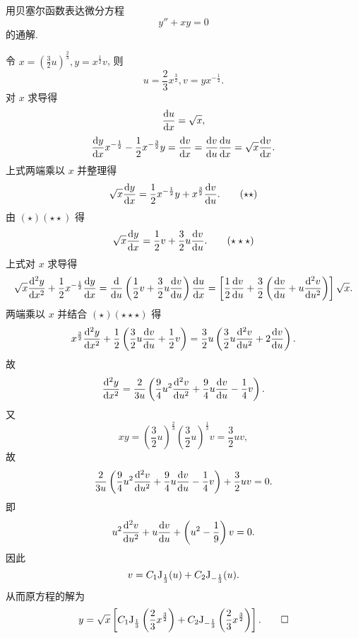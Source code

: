 \begin{exercise}
  用贝塞尔函数表达微分方程
  \[y''+xy=0\]
  的通解.
\end{exercise}

\begin{solution} 
  令 $x=\left(\frac{3}{2}u\right)^{\frac{2}{3}},y=x^{\frac{1}{2}}v$, 则
  \begin{equation}
    u=\frac{2}{3}x^{\frac{3}{2}},v=yx^{-\frac{1}{2}}. \tag{$\star$}
  \end{equation}
  对 $x$ 求导得
  \[\frac{\mathop{}\!\mathrm{d} u}{\mathop{}\!\mathrm{d} x}=\sqrt{x},\]
  \[\frac{\diff y}{\diff x}x^{-\frac{1}{2}}-\frac{1}{2}x^{-\frac{3}{2}}y
    = \frac{\diff v}{\diff x}=\frac{\diff v}{\diff u}\frac{\diff u}{\diff x}
    = \sqrt{x}\frac{\diff v}{\diff x}.\]
  上式两端乘以 $x$ 并整理得
  \begin{equation}
    \sqrt{x}\frac{\mathop{}\!\mathrm{d} y}{\mathop{}\!\mathrm{d} x}
      = \frac{1}{2}x^{-\frac{1}{2}}y+x^{\frac{3}{2}}\frac{\mathop{}\!\mathrm{d} v}{\mathop{}\!\mathrm{d} u}.
    \tag{$\star\star$}
  \end{equation}
  由 $(\star)(\star\star)$ 得
  \begin{equation}
    \sqrt{x}\frac{\mathop{}\!\mathrm{d} y}{\mathop{}\!\mathrm{d} x}=\frac{1}{2}v+\frac{3}{2}u\frac{\mathop{}\!\mathrm{d} v}{\mathop{}\!\mathrm{d} u}.
    \tag{$\star\star\star$}
  \end{equation}
  上式对 $x$ 求导得
  \[\sqrt{x}\frac{\diff^2y}{\diff x^2}+\frac{1}{2}x^{-\frac{1}{2}}\frac{\diff y}{\diff x}
    = \frac{\diff}{\diff u}\left(\frac{1}{2}v+\frac{3}{2}u\frac{\diff v}{\diff u}\right)\frac{\diff u}{\diff x}
    = \left[\frac{1}{2}\frac{\diff v}{\diff u}+\frac{3}{2}\left(\frac{\diff v}{\diff u}+u\frac{\diff^2v}{\diff u^2}\right)\right]\sqrt{x}.\]
  两端乘以 $x$ 并结合 $(\star)(\star\star\star)$ 得
  \[x^{\frac{3}{2}}\frac{\diff^2y}{\diff x^2}
    + \frac{1}{2}\left(\frac{3}{2}u\frac{\diff v}{\diff u}
    + \frac{1}{2}v\right)
    = \frac{3}{2}u\left(\frac{3}{2}u\frac{\diff^2v}{\diff u^2}+2\frac{\diff v}{\diff u}\right).\]
  故
  \[\frac{\mathop{}\!\mathrm{d}^2y}{\mathop{}\!\mathrm{d} x^2}=\frac{2}{3u}\left(\frac{9}{4}u^2\frac{\mathop{}\!\mathrm{d}^2v}{\mathop{}\!\mathrm{d} u^2}+\frac{9}{4}u\frac{\mathop{}\!\mathrm{d} v}{\mathop{}\!\mathrm{d} u}-\frac{1}{4}v\right).\]
  又
  \[xy=\left(\frac{3}{2}u\right)^{\frac{2}{3}}\left(\frac{3}{2}u\right)^{\frac{1}{3}}v=\frac{3}{2}uv,\]
  故
  \[\frac{2}{3u}\left(\frac{9}{4}u^2\frac{\mathop{}\!\mathrm{d}^2v}{\mathop{}\!\mathrm{d} u^2}+\frac{9}{4}u\frac{\mathop{}\!\mathrm{d} v}{\mathop{}\!\mathrm{d} u}-\frac{1}{4}v\right)+\frac{3}{2}uv=0.\]
  即
  \[u^2\frac{\mathop{}\!\mathrm{d}^2v}{\mathop{}\!\mathrm{d} u^2}+u\frac{\mathop{}\!\mathrm{d} v}{\mathop{}\!\mathrm{d} u}+\left(u^2-\frac{1}{9}\right)v=0.\]
  因此
  \[v=C_1\mathrm{J}_{\frac{1}{3}}(u)+C_2\mathrm{J}_{-\frac{1}{3}}(u).\]
  从而原方程的解为
  \[y=\sqrt{x}\left[C_1\mathrm{J}_{\frac{1}{3}}\left(\frac{2}{3}x^{\frac{3}{2}}\right)+C_2\mathrm{J}_{-\frac{1}{3}}\left(\frac{2}{3}x^{\frac{3}{2}}\right)\right].\qedhere\]
\end{solution}
